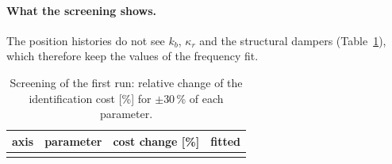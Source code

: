 \documentclass[10pt,a4paper]{article}
\numberwithin{equation}{section}
\begin{document}
\paragraph{What the screening shows.} The position histories do not see $k_b$, $\kappa_r$ and the structural dampers (Table~\ref{tab:screen}), which therefore keep the values of the frequency fit.
\begin{table}[H]\centering\small
\caption{Screening of the first run: relative change of the identification cost [\%] for $\pm30$\,\% of each parameter.}\label{tab:screen}
\begin{tabular}{llrl}\toprule
axis & parameter & cost change [\%] & fitted \\ \midrule
\\ \bottomrule
\end{tabular}\end{table}
\end{document}
